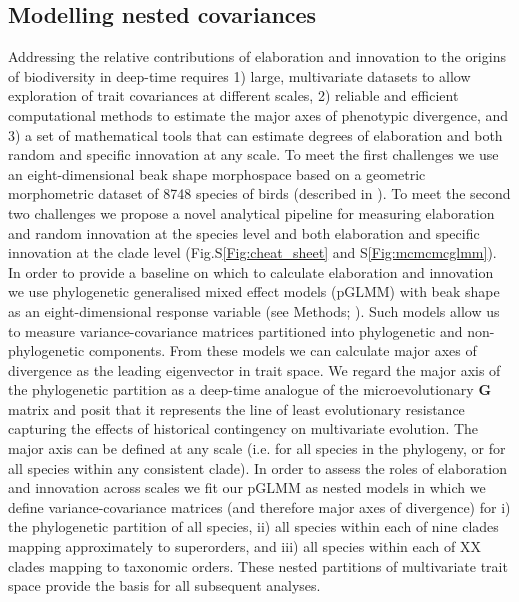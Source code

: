 \documentclass[12pt,letterpaper]{article}
\begin{document}
\subsection{Modelling nested covariances}
Addressing the relative contributions of elaboration and innovation to the origins of biodiversity in deep-time requires
1) large, multivariate datasets to allow exploration of trait covariances at different scales,
2) reliable and efficient computational methods to estimate the major axes of phenotypic divergence,
and 3) a set of mathematical tools that can estimate degrees of elaboration and both random and specific innovation at any scale. To meet the first challenges we use an eight-dimensional beak shape morphospace based on a geometric morphometric dataset of 8748 species of birds (described in \cite{hughes2022global}). To meet the second two challenges we propose a novel analytical pipeline for measuring elaboration and random innovation at the species level and both elaboration and specific innovation at the clade level (Fig.S\ref{Fig:cheat_sheet} and S\ref{Fig:mcmcmcglmm}). In order to provide a baseline on which to calculate elaboration and innovation we use phylogenetic generalised mixed effect models (pGLMM) with beak shape as an eight-dimensional response variable (see Methods; \cite{MCMCglmm}). Such models allow us to measure variance-covariance matrices partitioned into phylogenetic and non-phylogenetic components. From these models we can calculate major axes of divergence as the leading eigenvector in trait space. We regard the major axis of the phylogenetic partition as a deep-time analogue of the microevolutionary \textbf{G} matrix and posit that it represents the line of least evolutionary resistance capturing the effects of historical contingency on multivariate evolution. The major axis can be defined at any scale (i.e. for all species in the phylogeny, or for all species within any consistent clade). In order to assess the roles of elaboration and innovation across scales we fit our pGLMM as nested models in which we define variance-covariance matrices (and therefore major axes of divergence) for i) the phylogenetic partition of all species, ii) all species within each of nine clades mapping approximately to superorders, and iii) all species within each of XX clades mapping to taxonomic orders. These nested partitions of multivariate trait space provide the basis for all subsequent analyses.
\end{document}
